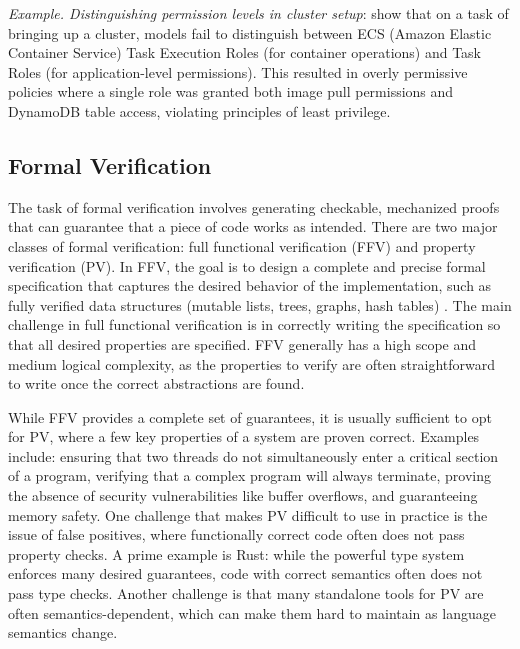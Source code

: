 \begin{tcolorbox}[colback=lightblue, boxrule=0pt, arc=5pt, outer arc=5pt]
\textit{Example. Distinguishing permission levels in cluster setup}: \cite{terrateam2024} show that on a task of bringing up a cluster, models fail to distinguish between ECS (Amazon Elastic Container Service) Task Execution Roles (for container operations) and Task Roles (for application-level permissions). This resulted in overly permissive policies where a single role was granted both image pull permissions and DynamoDB table access, violating principles of least privilege.
\end{tcolorbox}



\subsection{Formal Verification} \label{subsec:formal-verification}

The task of formal verification involves generating checkable, mechanized proofs that can guarantee that a piece of code works as intended. There are two major classes of formal verification: full functional verification (FFV) and property verification (PV). In FFV, the goal is to design a complete and precise formal specification that captures the desired behavior of the implementation, such as fully verified data structures (mutable lists, trees, graphs, hash tables) \citep{zee2008full}. The main challenge in full functional verification is in correctly writing the specification so that all desired properties are specified. FFV generally has a high scope and medium logical complexity, as the properties to verify are often straightforward to write once the correct abstractions are found.

While FFV provides a complete set of guarantees, it is usually sufficient to opt for PV, where a few key properties of a system are proven correct. Examples include: ensuring that two threads do not simultaneously enter a critical section of a program, verifying that a complex program will always terminate, proving the absence of security vulnerabilities like buffer overflows, and guaranteeing memory safety. One challenge that makes PV difficult to use in practice is the issue of false positives, where functionally correct code often does not pass property checks. A prime example is Rust: while the powerful type system enforces many desired guarantees, code with correct semantics often does not pass type checks. Another challenge is that many standalone tools for PV are often semantics-dependent, which can make them hard to maintain as language semantics change.

